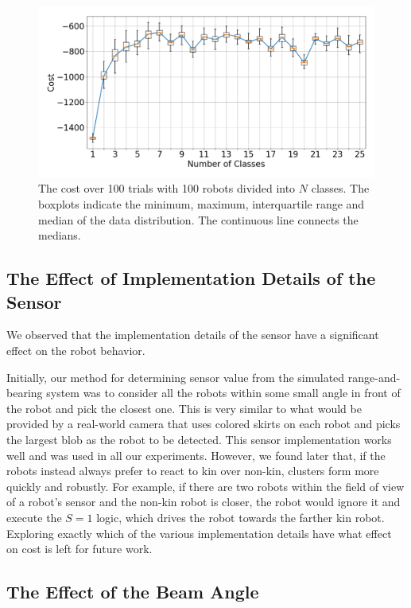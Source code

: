 \documentclass[letterpaper, 10 pt, conference]{ieeeconf}
\begin{document}
\begin{figure}[t]
  \centering
  \includegraphics[width=0.9\linewidth]{./images/num_classes_vs_cost_100_robots}
  \caption{The cost over 100 trials with 100 robots divided into $N$
    classes. The boxplots indicate the minimum, maximum, interquartile range and
    median of the data distribution. The continuous line connects the medians.}
  \label{fig:num_classes_100}
\end{figure}

\subsection{The Effect of Implementation Details of the Sensor} \label{section:sensor_impl}

We observed that the implementation details of the sensor have a significant
effect on the robot behavior.

Initially, our method for determining sensor value from the simulated
range-and-bearing system was to consider all the robots within some small angle
in front of the robot and pick the closest one. This is very similar to what
would be provided by a real-world camera that uses colored skirts on each robot
and picks the largest blob as the robot to be detected. This sensor
implementation works well and was used in all our experiments. However, we found
later that, if the robots instead always prefer to react to kin over non-kin,
clusters form more quickly and robustly. For example, if there are two robots
within the field of view of a robot's sensor and the non-kin robot is closer,
the robot would ignore it and execute the $S=1$ logic, which drives the robot
towards the farther kin robot. Exploring exactly which of the various
implementation details have what effect on cost is left for future work.

\subsection{The Effect of the Beam Angle} \label{sec:aperture_angle}
\end{document}
